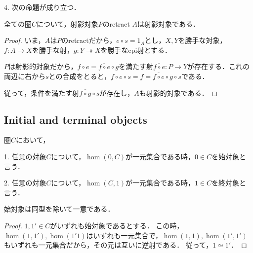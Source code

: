 \documentclass[uplatex, 12pt, dvipdfmx]{jsarticle}
\begin{document}
\begin{remark*}
    4. 次の命題が成り立つ．
    \begin{proposition*}
        全ての圏$C$について，射影対象$P$のretract $A$は射影対象である．
    \end{proposition*}
    \begin{proof}
        いま，$A$は$P$のretractだから，$e\circ s=1_A$とし，$X,Y$を勝手な対象，$f:A\to X$を勝手な射，$g:Y\twoheadrightarrow X$を勝手なepi射とする．
        \begin{center}
        \end{center}
        $P$は射影的対象だから，$f\circ e=\overline{f\circ e}\circ g$を満たす射$\overline{f\circ e}:P\to Y$が存在する．これの両辺に右から$s$との合成をとると，$f\circ e\circ s=f=\overline{f\circ e}\circ g\circ s$である．
        
        従って，条件を満たす射$\overline{f\circ g}\circ s$が存在し，$A$も射影的対象である．
    \end{proof}

    \vspace{3cm}
\end{remark*}

\subsection{Initial and terminal objects}

\begin{definition}
    圏$C$において，

    1. 任意の対象$C$について，$\hom(0,C)$が一元集合である時，$0\in C$を始対象と言う．

    2. 任意の対象$C$について，$\hom(C,1)$が一元集合である時，$1\in C$を終対象と言う．
\end{definition}

\begin{proposition}
    始対象は同型を除いて一意である．
\end{proposition}
\begin{proof}
    $1,1'\in C$がいずれも始対象であるとする．
    この時，$\hom(1,1'),\hom(1'1)$はいずれも一元集合で，$\hom(1,1),\hom(1',1')$もいずれも一元集合だから，その元は互いに逆射である．
    従って，$1\simeq 1'$．
\end{proof}
\vspace{3cm}
\end{document}
